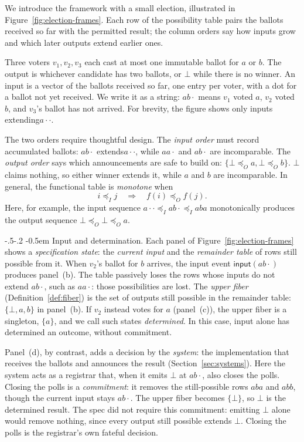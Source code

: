\documentclass[sigconf]{cidr-2027}
\makeatletter
\theoremstyle{remark}
\renewcommand\paragraph{\@startsection{paragraph}{4}{\z@}%
  {-.5\baselineskip \@plus -2\p@ \@minus -.2\p@}%
  {-0.5em}%
  {\normalfont\bfseries}}
\newcommand{\InputOrd}{\preceq_I}
\newcommand{\OutputOrd}{\preceq_O}
\newcommand{\commitment}{commitment\xspace}
\newcommand{\inrel}{extends\xspace}          %
\newcommand{\inrelpart}{extending\xspace}    %
\newcommand{\ingrow}{grow\xspace}            %
\newcommand{\outrel}{extends\xspace}          %
\newcommand{\outrelbase}{extend\xspace}       %
\makeatother
\begin{document}
We introduce the framework with a small election, illustrated in
Figure~\ref{fig:election-frames}.  Each row of the possibility table pairs
the ballots received so far with the permitted result; the column orders say how inputs \ingrow and which later outputs \outrelbase earlier ones.

Three voters $v_1,v_2,v_3$ each cast at most one immutable ballot for $a$ or
$b$.  The output is whichever candidate has two ballots, or $\bot$ while there
is no winner.  An input is a vector of the ballots received so far, one entry per voter, with a
dot for a ballot not yet received.  We write it as a string: $ab\cdot$ means
$v_1$ voted $a$, $v_2$ voted $b$, and $v_3$'s ballot has not arrived.  For brevity,
the figure shows only inputs \inrelpart $a\cdot\cdot$.

The two orders require thoughtful design.  The \emph{input order}
must record accumulated ballots: $ab\cdot$ \inrel $a\cdot\cdot$, while
$aa\cdot$ and $ab\cdot$ are incomparable.  The \emph{output order} says which
announcements are safe to build on: $\{\bot \OutputOrd a, \bot \OutputOrd b\}$.
$\bot$ claims nothing, so either winner
\outrel it, while $a$ and $b$ are incomparable.  In general, the functional table is \emph{monotone}
when
\[
  i\InputOrd j\quad\Longrightarrow\quad f(i)\OutputOrd f(j).
\]
Here, for example, the input sequence $a\cdot\cdot\InputOrd ab\cdot\InputOrd aba$
monotonically produces the output sequence $\bot\OutputOrd\bot\OutputOrd a$.

\paragraph{Input and determination.}
Each panel of Figure~\ref{fig:election-frames} shows a \emph{specification
state}: the \emph{current input} and the \emph{remainder table} of rows still
possible from it.  When $v_2$'s ballot for $b$ arrives, the input event
$\mathsf{input}(ab\cdot)$ produces panel~(b).  The table passively loses the rows
whose inputs do not extend $ab\cdot$, such as $aa\cdot$: those possibilities are
lost.  The \emph{upper fiber} (Definition~\ref{def:fiber}) is the set of outputs still possible in the
remainder table: $\{\bot,a,b\}$ in panel~(b).  If $v_2$ instead votes for $a$
(panel~(c)), the upper fiber is a singleton, $\{a\}$, and we call such
states \emph{determined}.  In this case, input alone has determined an outcome,
without \commitment.

Panel~(d), by contrast, adds a decision by the \emph{system}: the implementation
that receives the ballots and announces the result (Section~\ref{sec:systems}).  Here
the system acts as a registrar that, when it emits $\bot$ at $ab\cdot$, also
closes the polls.  Closing the polls is a \emph{\commitment}: it removes the
still-possible rows $aba$ and $abb$, though the current input stays $ab\cdot$.
The upper fiber becomes $\{\bot\}$, so $\bot$ is the determined result.
The spec did not require this \commitment: emitting $\bot$ alone would remove
nothing, since every output still possible extends $\bot$.  Closing the polls is
the registrar's own fateful decision.
\end{document}
